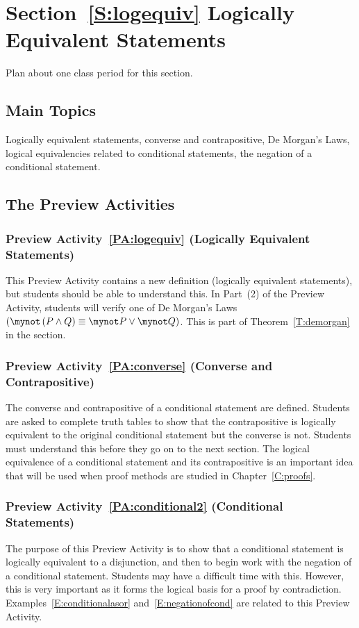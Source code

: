 \section*{Section~\ref{S:logequiv} Logically Equivalent Statements}
Plan about one class period for this section.

\subsection*{Main Topics}
Logically equivalent statements, converse and contrapositive, De Morgan's Laws, logical equivalencies related to conditional statements, the negation of a conditional statement.


\subsection*{The Preview Activities}
\subsubsection{Preview Activity~\ref{PA:logequiv} (Logically Equivalent Statements)}  This Preview Activity contains a new definition (logically equivalent statements), but students should be able to understand this.  In Part~(2) of the Preview Activity, students will verify one of De Morgan's Laws $\left( \mynot \left( P \wedge Q \right) \equiv \mynot P \vee \mynot Q \right)$.  This is part of Theorem~\ref{T:demorgan} in the section.  

\subsubsection*{Preview Activity~\ref{PA:converse} (Converse and Contrapositive)}
The converse and contrapositive of a conditional statement are defined.  Students are asked to complete truth tables to show that the contrapositive is logically equivalent to the original conditional statement but the converse is not.  Students must understand this before they go on to the next section.  The logical equivalence of a conditional statement and its contrapositive is an important idea that will be used when proof methods are studied in Chapter~\ref{C:proofs}.

\subsubsection*{Preview Activity~\ref{PA:conditional2} (Conditional Statements)}
The purpose of this Preview Activity is to show that a conditional statement is logically equivalent to a disjunction, and then to begin work with the negation of a conditional statement.  Students may have a difficult time with this.  However, this is very important as it forms the logical basis for a proof by contradiction.  Examples~\ref{E:conditionalasor} and~\ref{E:negationofcond} are related to this Preview Activity.
\hbreak

